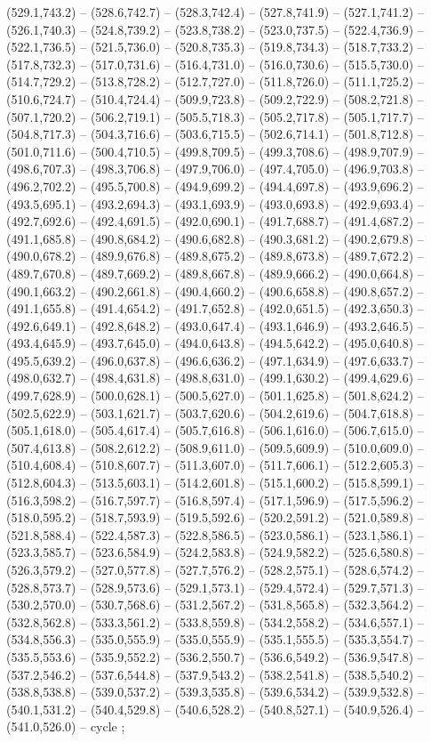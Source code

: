 (529.1,743.2) -- (528.6,742.7) -- (528.3,742.4) -- (527.8,741.9) -- (527.1,741.2) -- (526.1,740.3) -- (524.8,739.2) -- (523.8,738.2) -- (523.0,737.5) -- (522.4,736.9) -- (522.1,736.5) -- (521.5,736.0) -- (520.8,735.3) -- (519.8,734.3) -- (518.7,733.2) -- (517.8,732.3) -- (517.0,731.6) -- (516.4,731.0) -- (516.0,730.6) -- (515.5,730.0) -- (514.7,729.2) -- (513.8,728.2) -- (512.7,727.0) -- (511.8,726.0) -- (511.1,725.2) -- (510.6,724.7) -- (510.4,724.4) -- (509.9,723.8) -- (509.2,722.9) -- (508.2,721.8) -- (507.1,720.2) -- (506.2,719.1) -- (505.5,718.3) -- (505.2,717.8) -- (505.1,717.7) -- (504.8,717.3) -- (504.3,716.6) -- (503.6,715.5) -- (502.6,714.1) -- (501.8,712.8) -- (501.0,711.6) -- (500.4,710.5) -- (499.8,709.5) -- (499.3,708.6) -- (498.9,707.9) -- (498.6,707.3) -- (498.3,706.8) -- (497.9,706.0) -- (497.4,705.0) -- (496.9,703.8) -- (496.2,702.2) -- (495.5,700.8) -- (494.9,699.2) -- (494.4,697.8) -- (493.9,696.2) -- (493.5,695.1) -- (493.2,694.3) -- (493.1,693.9) -- (493.0,693.8) -- (492.9,693.4) -- (492.7,692.6) -- (492.4,691.5) -- (492.0,690.1) -- (491.7,688.7) -- (491.4,687.2) -- (491.1,685.8) -- (490.8,684.2) -- (490.6,682.8) -- (490.3,681.2) -- (490.2,679.8) -- (490.0,678.2) -- (489.9,676.8) -- (489.8,675.2) -- (489.8,673.8) -- (489.7,672.2) -- (489.7,670.8) -- (489.7,669.2) -- (489.8,667.8) -- (489.9,666.2) -- (490.0,664.8) -- (490.1,663.2) -- (490.2,661.8) -- (490.4,660.2) -- (490.6,658.8) -- (490.8,657.2) -- (491.1,655.8) -- (491.4,654.2) -- (491.7,652.8) -- (492.0,651.5) -- (492.3,650.3) -- (492.6,649.1) -- (492.8,648.2) -- (493.0,647.4) -- (493.1,646.9) -- (493.2,646.5) -- (493.4,645.9) -- (493.7,645.0) -- (494.0,643.8) -- (494.5,642.2) -- (495.0,640.8) -- (495.5,639.2) -- (496.0,637.8) -- (496.6,636.2) -- (497.1,634.9) -- (497.6,633.7) -- (498.0,632.7) -- (498.4,631.8) -- (498.8,631.0) -- (499.1,630.2) -- (499.4,629.6) -- (499.7,628.9) -- (500.0,628.1) -- (500.5,627.0) -- (501.1,625.8) -- (501.8,624.2) -- (502.5,622.9) -- (503.1,621.7) -- (503.7,620.6) -- (504.2,619.6) -- (504.7,618.8) -- (505.1,618.0) -- (505.4,617.4) -- (505.7,616.8) -- (506.1,616.0) -- (506.7,615.0) -- (507.4,613.8) -- (508.2,612.2) -- (508.9,611.0) -- (509.5,609.9) -- (510.0,609.0) -- (510.4,608.4) -- (510.8,607.7) -- (511.3,607.0) -- (511.7,606.1) -- (512.2,605.3) -- (512.8,604.3) -- (513.5,603.1) -- (514.2,601.8) -- (515.1,600.2) -- (515.8,599.1) -- (516.3,598.2) -- (516.7,597.7) -- (516.8,597.4) -- (517.1,596.9) -- (517.5,596.2) -- (518.0,595.2) -- (518.7,593.9) -- (519.5,592.6) -- (520.2,591.2) -- (521.0,589.8) -- (521.8,588.4) -- (522.4,587.3) -- (522.8,586.5) -- (523.0,586.1) -- (523.1,586.1) -- (523.3,585.7) -- (523.6,584.9) -- (524.2,583.8) -- (524.9,582.2) -- (525.6,580.8) -- (526.3,579.2) -- (527.0,577.8) -- (527.7,576.2) -- (528.2,575.1) -- (528.6,574.2) -- (528.8,573.7) -- (528.9,573.6) -- (529.1,573.1) -- (529.4,572.4) -- (529.7,571.3) -- (530.2,570.0) -- (530.7,568.6) -- (531.2,567.2) -- (531.8,565.8) -- (532.3,564.2) -- (532.8,562.8) -- (533.3,561.2) -- (533.8,559.8) -- (534.2,558.2) -- (534.6,557.1) -- (534.8,556.3) -- (535.0,555.9) -- (535.0,555.9) -- (535.1,555.5) -- (535.3,554.7) -- (535.5,553.6) -- (535.9,552.2) -- (536.2,550.7) -- (536.6,549.2) -- (536.9,547.8) -- (537.2,546.2) -- (537.6,544.8) -- (537.9,543.2) -- (538.2,541.8) -- (538.5,540.2) -- (538.8,538.8) -- (539.0,537.2) -- (539.3,535.8) -- (539.6,534.2) -- (539.9,532.8) -- (540.1,531.2) -- (540.4,529.8) -- (540.6,528.2) -- (540.8,527.1) -- (540.9,526.4) -- (541.0,526.0) -- cycle ;
